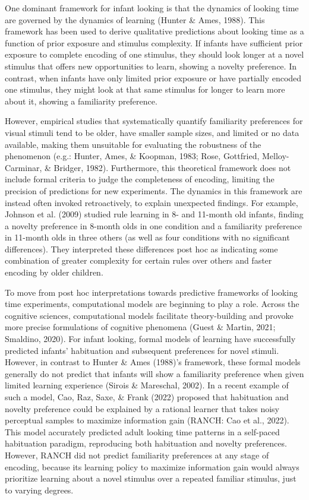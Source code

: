 \documentclass[10pt, letterpaper]{article}
\begin{document}
One dominant framework for infant looking is that the dynamics of
looking time are governed by the dynamics of learning (Hunter \& Ames,
1988). This framework has been used to derive qualitative predictions
about looking time as a function of prior exposure and stimulus
complexity. If infants have sufficient prior exposure to complete
encoding of one stimulus, they should look longer at a novel stimulus
that offers new opportunities to learn, showing a novelty preference. In
contrast, when infants have only limited prior exposure or have
partially encoded one stimulus, they might look at that same stimulus
for longer to learn more about it, showing a familiarity preference.

However, empirical studies that systematically quantify familiarity
preferences for visual stimuli tend to be older, have smaller sample
sizes, and limited or no data available, making them unsuitable for
evaluating the robustness of the phenomenon (e.g.: Hunter, Ames, \&
Koopman, 1983; Rose, Gottfried, Melloy-Carminar, \& Bridger, 1982).
Furthermore, this theoretical framework does not include formal criteria
to judge the completeness of encoding, limiting the precision of
predictions for new experiments. The dynamics in this framework are
instead often invoked retroactively, to explain unexpected findings. For
example, Johnson et al. (2009) studied rule learning in 8- and 11-month
old infants, finding a novelty preference in 8-month olds in one
condition and a familiarity preference in 11-month olds in three others
(as well as four conditions with no significant differences). They
interpreted these differences post hoc as indicating some combination of
greater complexity for certain rules over others and faster encoding by
older children.

To move from post hoc interpretations towards predictive frameworks of
looking time experiments, computational models are beginning to play a
role. Across the cognitive sciences, computational models facilitate
theory-building and provoke more precise formulations of cognitive
phenomena (Guest \& Martin, 2021; Smaldino, 2020). For infant looking,
formal models of learning have successfully predicted infants'
habituation and subsequent preferences for novel stimuli. However, in
contrast to Hunter \& Ames (1988)'s framework, these formal models
generally do not predict that infants will show a familiarity preference
when given limited learning experience (Sirois \& Mareschal, 2002). In a
recent example of such a model, Cao, Raz, Saxe, \& Frank (2022) proposed
that habituation and novelty preference could be explained by a rational
learner that takes noisy perceptual samples to maximize information gain
(RANCH: Cao et al., 2022). This model accurately predicted adult looking
time patterns in a self-paced habituation paradigm, reproducing both
habituation and novelty preferences. However, RANCH did not predict
familiarity preferences at any stage of encoding, because its learning
policy to maximize information gain would always prioritize learning
about a novel stimulus over a repeated familiar stimulus, just to
varying degrees.
\end{document}
